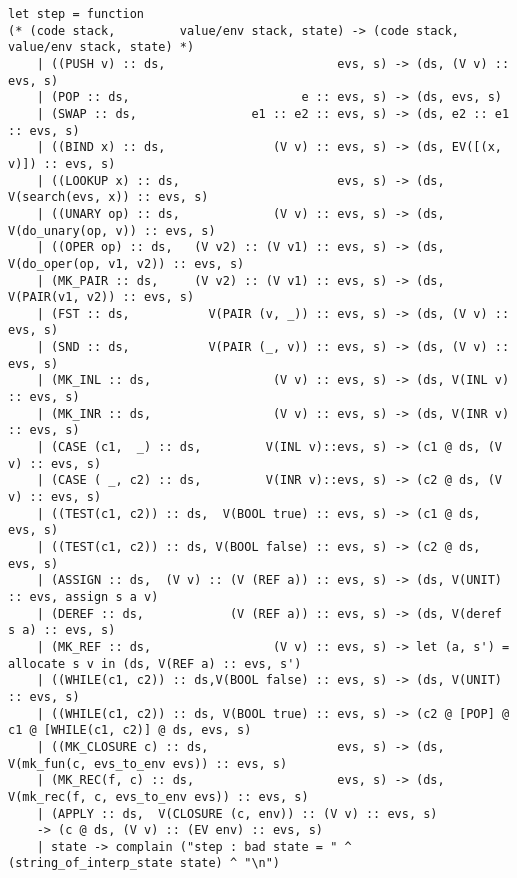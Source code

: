 \documentclass{article}
\begin{document}
\begin{lstlisting}
let step = function 
(* (code stack,         value/env stack, state) -> (code stack,  value/env stack, state) *) 
	| ((PUSH v) :: ds,                        evs, s) -> (ds, (V v) :: evs, s)
	| (POP :: ds,                        e :: evs, s) -> (ds, evs, s) 
	| (SWAP :: ds,                e1 :: e2 :: evs, s) -> (ds, e2 :: e1 :: evs, s) 
	| ((BIND x) :: ds,               (V v) :: evs, s) -> (ds, EV([(x, v)]) :: evs, s) 
	| ((LOOKUP x) :: ds,                      evs, s) -> (ds, V(search(evs, x)) :: evs, s)
	| ((UNARY op) :: ds,             (V v) :: evs, s) -> (ds, V(do_unary(op, v)) :: evs, s) 
	| ((OPER op) :: ds,   (V v2) :: (V v1) :: evs, s) -> (ds, V(do_oper(op, v1, v2)) :: evs, s)
	| (MK_PAIR :: ds,     (V v2) :: (V v1) :: evs, s) -> (ds, V(PAIR(v1, v2)) :: evs, s)
	| (FST :: ds,           V(PAIR (v, _)) :: evs, s) -> (ds, (V v) :: evs, s)
	| (SND :: ds,           V(PAIR (_, v)) :: evs, s) -> (ds, (V v) :: evs, s)
	| (MK_INL :: ds,                 (V v) :: evs, s) -> (ds, V(INL v) :: evs, s)
	| (MK_INR :: ds,                 (V v) :: evs, s) -> (ds, V(INR v) :: evs, s)
	| (CASE (c1,  _) :: ds,         V(INL v)::evs, s) -> (c1 @ ds, (V v) :: evs, s) 
	| (CASE ( _, c2) :: ds,         V(INR v)::evs, s) -> (c2 @ ds, (V v) :: evs, s) 
	| ((TEST(c1, c2)) :: ds,  V(BOOL true) :: evs, s) -> (c1 @ ds, evs, s) 
	| ((TEST(c1, c2)) :: ds, V(BOOL false) :: evs, s) -> (c2 @ ds, evs, s)
	| (ASSIGN :: ds,  (V v) :: (V (REF a)) :: evs, s) -> (ds, V(UNIT) :: evs, assign s a v)
	| (DEREF :: ds,            (V (REF a)) :: evs, s) -> (ds, V(deref s a) :: evs, s)
	| (MK_REF :: ds,                 (V v) :: evs, s) -> let (a, s') = allocate s v in (ds, V(REF a) :: evs, s')
	| ((WHILE(c1, c2)) :: ds,V(BOOL false) :: evs, s) -> (ds, V(UNIT) :: evs, s) 
	| ((WHILE(c1, c2)) :: ds, V(BOOL true) :: evs, s) -> (c2 @ [POP] @ c1 @ [WHILE(c1, c2)] @ ds, evs, s)
	| ((MK_CLOSURE c) :: ds,                  evs, s) -> (ds,  V(mk_fun(c, evs_to_env evs)) :: evs, s)
	| (MK_REC(f, c) :: ds,                    evs, s) -> (ds,  V(mk_rec(f, c, evs_to_env evs)) :: evs, s)
	| (APPLY :: ds,  V(CLOSURE (c, env)) :: (V v) :: evs, s) 
	-> (c @ ds, (V v) :: (EV env) :: evs, s)
	| state -> complain ("step : bad state = " ^ (string_of_interp_state state) ^ "\n")
	

\end{lstlisting}
\end{document}

